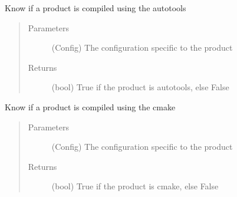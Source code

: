 \documentclass[a4paper,10pt,english]{sphinxmanual}
\begin{document}
\begin{fulllineitems}
\label{\detokenize{apidoc_src/src:src.product.product_is_autotools}}
Know if a product is compiled using the autotools
\begin{quote}\begin{description}
\item[{Parameters}] \leavevmode
{} \textendash{} (Config)
The configuration specific to the product

\item[{Returns}] \leavevmode
(bool) 
True if the product is autotools, else False

\end{description}\end{quote}

\end{fulllineitems}


\begin{fulllineitems}
\label{\detokenize{apidoc_src/src:src.product.product_is_cmake}}
Know if a product is compiled using the cmake
\begin{quote}\begin{description}
\item[{Parameters}] \leavevmode
{} \textendash{} (Config)
The configuration specific to the product

\item[{Returns}] \leavevmode
(bool) 
True if the product is cmake, else False

\end{description}\end{quote}

\end{fulllineitems}

\end{document}
